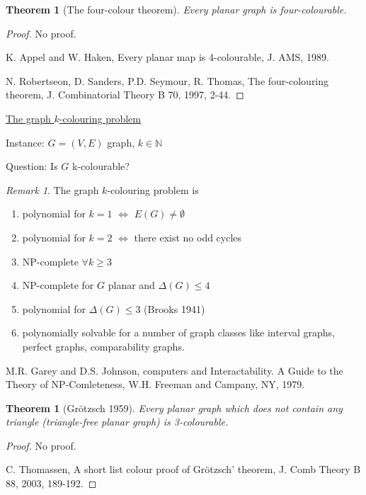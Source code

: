 \documentclass[a4paper]{article}
\theoremstyle{definition}\newtheorem*{defi*}{Definition}
\theoremstyle{remark}\newtheorem*{rem}{Remark}
\theoremstyle{plain}\newtheorem{lemma}[cnt]{Lemma}
\theoremstyle{definition}\newtheorem*{ex}{Example}
\theoremstyle{definition}\newtheorem*{exs}{Examples}
\theoremstyle{plain}\newtheorem{theorem}[cnt]{Theorem}
\theoremstyle{plain}\newtheorem{prop}[cnt]{Proposition}
\theoremstyle{plain}\newtheorem*{cor*}{Corollary}
\theoremstyle{definition}\newtheorem{nota}{Notation}
\theoremstyle{definition}\newtheorem*{nota*}{Notation}
\theoremstyle{plain}\newtheorem{conj}[cnt]{Conjecture}
\newcommand{\N}{\mathbb{N}}
\begin{document}
\begin{theorem}[The four-colour theorem]
  Every planar graph is four-colourable.
\end{theorem}

\begin{proof}
  No proof. 
  
  K. Appel and W. Haken, Every planar map is 4-colourable, J. AMS, 1989.
  
  N. Robertseon, D. Sanders, P.D. Seymour, R. Thomas, The four-colouring theorem, J. Combinatorial Theory B 70, 1997, 2-44.
\end{proof}

\underline{The graph $k$-colouring problem} 

Instance: $G= (V,E)$ graph, $k \in \N$

Question: Is $G$ k-colourable?

\begin{rem}
  The graph $k$-colouring problem is
  \begin{enumerate}
    \item polynomial for $k=1$ $\iff$ $E(G) \neq \emptyset$
    \item polynomial for $k=2$ $\iff$ there exist no odd cycles
    \item NP-complete $\forall k \geq 3$
    \item NP-complete for $G$ planar and $\Delta(G) \leq 4$
    \item polynomial for $\Delta(G) \leq 3$ (Brooks 1941)
    \item polynomially solvable for a number of graph classes like interval graphs, perfect graphs, comparability graphs.
  \end{enumerate}

  M.R. Garey and D.S. Johnson, computers and Interactability. A Guide to the Theory of NP-Comleteness, W.H. Freeman and Campany, NY, 1979.
\end{rem}


\begin{theorem}[Grötzsch 1959]
  Every planar graph which does not contain any triangle (triangle-free planar graph) is 3-colourable.
\end{theorem}

\begin{proof}
  No proof.
  
  C. Thomassen, A short list colour proof of Grötzsch' theorem, J. Comb Theory B 88, 2003, 189-192.
\end{proof}













\end{document}
